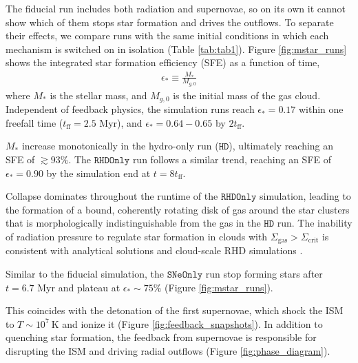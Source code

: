 \documentclass[twocolumn,linenumbers]{aastex631}
\begin{document}
The fiducial run includes both radiation and supernovae, so on its own it cannot show which of them stops star formation and drives the outflows. To separate their effects, we compare runs with the same initial conditions in which each mechanism is switched on in isolation (Table \ref{tab:tab1}).
Figure \ref{fig:mstar_runs} shows the integrated star formation efficiency (SFE) as a function of time, 
\begin{align}\label{eq1:sfe}
    \epsilon_* \equiv \frac{M_*}{M_{g,0}}
\end{align}
where $M_*$ is the stellar mass, and $M_{g,0}$ is the initial mass of the gas cloud. Independent of feedback physics, the simulation runs reach $\epsilon_* = 0.17$ within one freefall time ($t_\mathrm{ff}=2.5$ Myr), and $\epsilon_* = 0.64-0.65$ by $2t_\mathrm{ff}$.%

$M_*$ increase monotonically in the hydro-only run ($\mathtt{HD}$), ultimately reaching an SFE of $\gtrsim 93\%$. The $\mathtt{RHDOnly}$ run follows a similar trend, reaching an SFE of $\epsilon_* = 0.90 $ by the simulation end at $t = 8t_\mathrm{ff}$. 


Collapse dominates throughout the runtime of the $\mathtt{RHDOnly}$ simulation, leading to the formation of a bound, coherently rotating disk of gas around the star clusters that is morphologically indistinguishable from the gas in the $\mathtt{HD}$ run. The inability of radiation pressure to regulate star formation in clouds with $\Sigma_\mathrm{gas} > \Sigma_\mathrm{crit}$ is consistent with analytical solutions \citep{2010ApJ...710L.142F,2019MNRAS.483.5548G} and cloud-scale RHD simulations \citep{2023MNRAS.521.5160M}.





Similar to the fiducial simulation, the $\mathtt{SNeOnly}$ run stop forming stars after $t = 6.7$ Myr and plateau at $\epsilon_* \sim 75\%$ (Figure \ref{fig:mstar_runs}).

This coincides with the detonation of the first supernovae, which shock the ISM to $T \sim 10^7\ \mathrm{K}$ and ionize it (Figure \ref{fig:feedback_snapshots}). In addition to quenching star formation, the feedback from supernovae is responsible for disrupting the ISM and driving radial outflows (Figure \ref{fig:phase_diagram}). 
\end{document}
